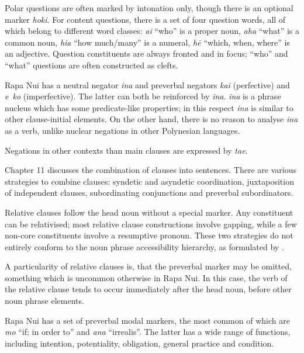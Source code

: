 Polar questions are often marked by intonation only, though there is an optional marker \textit{hoki}. For content questions, there is a set of four question words, all of which belong to different word classes: \textit{ai} “who” is a proper noun, \textit{aha} “what” is a common noun, \textit{hia} “how much/many” is a numeral, \textit{hē} “which, when, where” is an adjective. Question constituents are always fronted and in focus; “who” and “what” questions are often constructed as clefts.

Rapa Nui has a neutral negator \textit{{\ꞌ}ina} and preverbal negators \textit{kai} (perfective) and \textit{e~ko} (imperfective). The latter can both be reinforced by \textit{{\ꞌ}ina}. \textit{{\ꞌ}ina} is a phrase nucleus which has some predicate-like properties; in this respect \textit{{\ꞌ}ina} is similar to other clause-initial elements. On the other hand, there is no reason to analyse \textit{{\ꞌ}ina} as a verb, unlike nuclear negations in other Polynesian languages.

Negations in other contexts than main clauses are expressed by \textit{ta{\ꞌ}e}.

\medskip Chapter 11 discusses the combination of clauses into sentences. There are various strategies to combine clauses: syndetic and asyndetic coordination, juxtaposition of independent clauses, subordinating conjunctions and preverbal subordinators. 

Relative clauses follow the head noun without a special marker. Any constituent can be relativised; most relative clause constructions involve gapping, while a few non-core constituents involve a resumptive pronoun. These two strategies do not entirely conform to the noun phrase accessibility hierarchy, as formulated by \citet{KeenanComrie1977}. 

A particularity of relative clauses is, that the preverbal marker may be omitted, something which is uncommon otherwise in Rapa Nui. In this case, the verb of the relative clause tends to occur immediately after the head noun, before other noun phrase elements.

Rapa Nui has a set of preverbal modal markers, the most common of which are \textit{mo} “if; in order to” and \textit{ana} “irrealis”. The latter has a wide range of functions, including intention, potentiality, obligation, general practice and condition.

